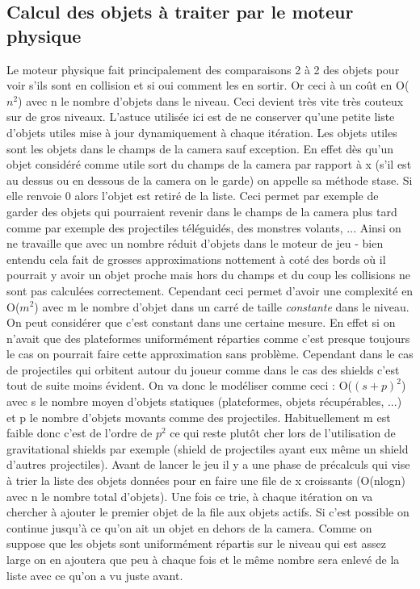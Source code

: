 \documentclass[11pt]{article}
\begin{document}
\subsection{Calcul des objets à traiter par le moteur physique}
Le moteur physique fait principalement des comparaisons 2 à 2 des objets pour voir s'ils sont en collision et si oui comment les en sortir. Or ceci à un coût en O($n^2$) avec n le nombre d'objets dans le niveau. Ceci devient très vite très couteux sur de gros niveaux. L'astuce utilisée ici est de ne conserver qu'une petite liste d'objets utiles mise à jour dynamiquement à chaque itération. Les objets utiles sont les objets dans le champs de la camera sauf exception. En effet dès qu'un objet considéré comme utile sort du champs de la camera par rapport à x (s'il est au dessus ou en dessous de la camera on le garde) on appelle sa méthode stase. Si elle renvoie 0 alors l'objet est retiré de la liste. Ceci permet par exemple de garder des objets qui pourraient revenir dans le champs de la camera plus tard comme par exemple des projectiles téléguidés, des monstres volants, ... Ainsi on ne travaille que avec un nombre réduit d'objets dans le moteur de jeu - bien entendu cela fait de grosses approximations nottement à coté des bords où il pourrait y avoir un objet proche mais hors du champs et du coup les collisions ne sont pas calculées correctement. Cependant ceci permet d'avoir une complexité en O($m^2$) avec m le nombre d'objet dans un carré de taille \emph{constante} dans le niveau. On peut considérer que c'est constant dans une certaine mesure. En effet si on n'avait que des plateformes uniformément réparties comme c'est presque toujours le cas on pourrait faire cette approximation sans problème. Cependant dans le cas de projectiles qui orbitent autour du joueur comme dans le cas des shields c'est tout de suite moins évident. On va donc le modéliser comme ceci : O($(s+p)^2$) avec s le nombre moyen d'objets statiques (plateformes, objets récupérables, ...) et p le nombre d'objets movants comme des projectiles. Habituellement m est faible donc c'est de l'ordre de $p^2$ ce qui reste plutôt cher lors de l'utilisation de gravitational shields par exemple (shield de projectiles ayant eux même un shield d'autres projectiles). Avant de lancer le jeu il y a une phase de précalculs qui vise à trier la liste des objets données pour en faire une file de x croissants (O(nlogn) avec n le nombre total d'objets). Une fois ce trie, à chaque itération on va chercher à ajouter le premier objet de la file aux objets actifs. Si c'est possible on continue jusqu'à ce qu'on ait un objet en dehors de la camera. Comme on suppose que les objets sont uniformément répartis sur le niveau qui est assez large on en ajoutera que peu à chaque fois et le même nombre sera enlevé de la liste avec ce qu'on a vu juste avant.
\end{document}
